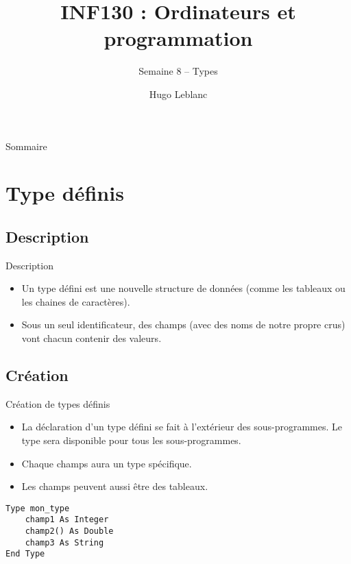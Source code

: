 \documentclass[aspectratio=169,usenames,dvipsnames]{beamer}
\title{INF130 : Ordinateurs et programmation}
\subtitle{Semaine 8 – Types }
\author{Hugo Leblanc}
\begin{document}
    \maketitle

    \begin{frame}{Sommaire}
        \tableofcontents
    \end{frame}

    \section{Type définis}
    \subsection{Description}
    \begin{frame}{Description}
        \begin{itemize}
            \item Un type défini est une nouvelle structure de données (comme les tableaux ou les chaines de caractères).
            \item Sous un seul identificateur, des champs (avec des noms de notre propre crus) vont chacun contenir des valeurs.
        \end{itemize}
    \end{frame}
    \subsection{Création}
    \begin{frame}[fragile]{Création de types définis}
        \begin{itemize}
            \item La déclaration d’un type défini se fait à l’extérieur des sous-programmes. Le type sera disponible pour tous les sous-programmes.
            \item Chaque champs aura un type spécifique.
            \item Les champs peuvent aussi être des tableaux.      
        \end{itemize}
\begin{lstlisting}
Type mon_type
    champ1 As Integer
    champ2() As Double
    champ3 As String
End Type
\end{lstlisting} 
    \end{frame}
\end{document}
